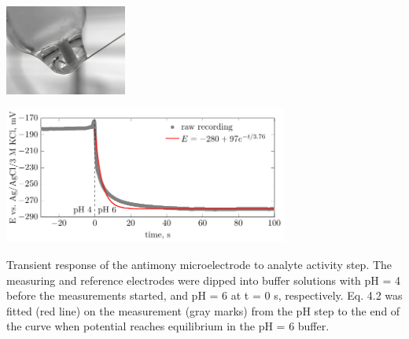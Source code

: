 \documentclass{beamer}
\begin{document}
\begin{frame}
\centering
\includegraphics[width=0.3\textwidth]{hanging.jpg}

\includegraphics[width=0.7\textwidth]{phd-figure17.pdf}

\vfill
\small
Transient response of the antimony microelectrode to analyte activity step.
The measuring and reference electrodes were dipped into buffer solutions with pH = 4 before the measurements started, and pH = 6 at t = 0 s, respectively.
Eq. 4.2 was fitted (red line) on the measurement (gray marks) from the pH step to the end of the curve when potential reaches equilibrium in the pH = 6 buffer.
\end{frame}
\end{document}

